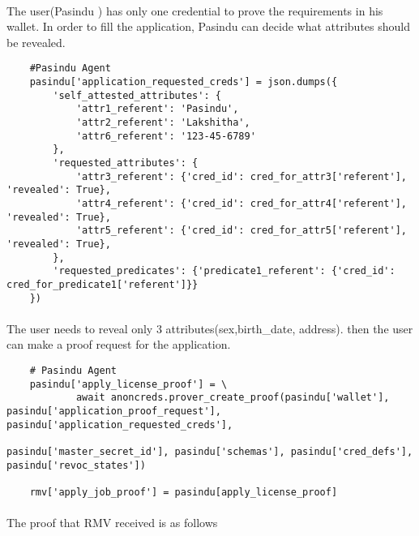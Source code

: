 \paragraph{}
The user(Pasindu ) has only one credential to prove the requirements in his wallet. In order to fill the application, Pasindu can decide what attributes should be revealed.

\begin{verbatim}
    #Pasindu Agent
    pasindu['application_requested_creds'] = json.dumps({
        'self_attested_attributes': {
            'attr1_referent': 'Pasindu',
            'attr2_referent': 'Lakshitha',
            'attr6_referent': '123-45-6789'
        },
        'requested_attributes': {
            'attr3_referent': {'cred_id': cred_for_attr3['referent'], 'revealed': True},
            'attr4_referent': {'cred_id': cred_for_attr4['referent'], 'revealed': True},
            'attr5_referent': {'cred_id': cred_for_attr5['referent'], 'revealed': True},
        },
        'requested_predicates': {'predicate1_referent': {'cred_id': cred_for_predicate1['referent']}}
    })

\end{verbatim}

\paragraph{}
The user needs to reveal only 3 attributes(sex,birth\_date, address). then the user can make a proof request for the application.

\begin{verbatim}
    # Pasindu Agent
    pasindu['apply_license_proof'] = \
            await anoncreds.prover_create_proof(pasindu['wallet'], pasindu['application_proof_request'], pasindu['application_requested_creds'],
                                                pasindu['master_secret_id'], pasindu['schemas'], pasindu['cred_defs'], pasindu['revoc_states'])

    rmv['apply_job_proof'] = pasindu[apply_license_proof]
\end{verbatim}

\paragraph{}
The proof that RMV received is as follows

